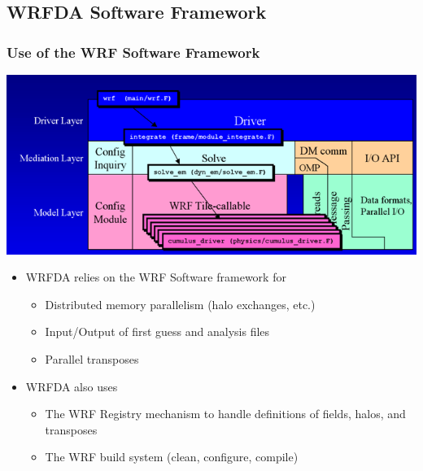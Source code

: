 \documentclass{beamer}
\begin{document}
\subsection{WRFDA Software Framework}
\begin{frame}
\frametitle{Use of the WRF Software Framework} 
\begin{center} 
\includegraphics[scale=0.4]{wrfSoftFrame}
\end{center}\pause
\begin{itemize}
\item WRFDA relies on the WRF Software framework for \pause
\begin{itemize}
\item Distributed memory parallelism (halo exchanges, etc.) \pause
\item Input/Output of first guess and analysis files \pause
\item Parallel transposes \pause
\end{itemize} \pause
\item  WRFDA also uses \pause
\begin{itemize}
\item The WRF Registry mechanism to handle definitions of fields, halos, and transposes \pause
\item The WRF build system (clean, configure, compile)
\end{itemize}
\end{itemize}
\end{frame}
\end{document}
